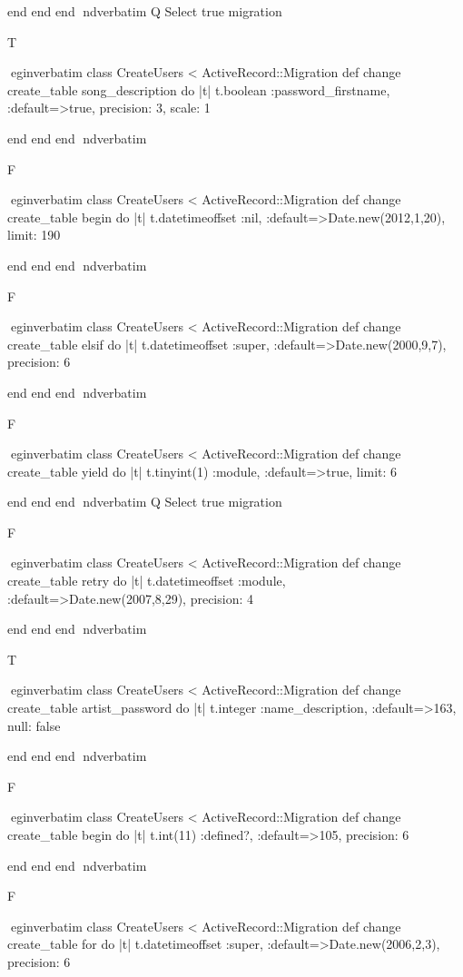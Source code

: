     end 
  end 
end
nd{verbatim}
Q
 Select true migration

T

egin{verbatim}
 class CreateUsers < ActiveRecord::Migration 
  def change 
    create_table song_description do |t| 
      t.boolean :password_firstname, :default=>true, precision: 3, scale: 1
    
    end 
  end 
end
nd{verbatim}

F

egin{verbatim}
 class CreateUsers < ActiveRecord::Migration 
  def change 
    create_table begin do |t| 
      t.datetimeoffset :nil, :default=>Date.new(2012,1,20), limit: 190
    
    end 
  end 
end
nd{verbatim}

F

egin{verbatim}
 class CreateUsers < ActiveRecord::Migration 
  def change 
    create_table elsif do |t| 
      t.datetimeoffset :super, :default=>Date.new(2000,9,7), precision: 6
    
    end 
  end 
end
nd{verbatim}

F

egin{verbatim}
 class CreateUsers < ActiveRecord::Migration 
  def change 
    create_table yield do |t| 
      t.tinyint(1) :module, :default=>true, limit: 6
    
    end 
  end 
end
nd{verbatim}
Q
 Select true migration

F

egin{verbatim}
 class CreateUsers < ActiveRecord::Migration 
  def change 
    create_table retry do |t| 
      t.datetimeoffset :module, :default=>Date.new(2007,8,29), precision: 4
    
    end 
  end 
end
nd{verbatim}

T

egin{verbatim}
 class CreateUsers < ActiveRecord::Migration 
  def change 
    create_table artist_password do |t| 
      t.integer :name_description, :default=>163, null: false
    
    end 
  end 
end
nd{verbatim}

F

egin{verbatim}
 class CreateUsers < ActiveRecord::Migration 
  def change 
    create_table begin do |t| 
      t.int(11) :defined?, :default=>105, precision: 6
    
    end 
  end 
end
nd{verbatim}

F

egin{verbatim}
 class CreateUsers < ActiveRecord::Migration 
  def change 
    create_table for do |t| 
      t.datetimeoffset :super, :default=>Date.new(2006,2,3), precision: 6
    
